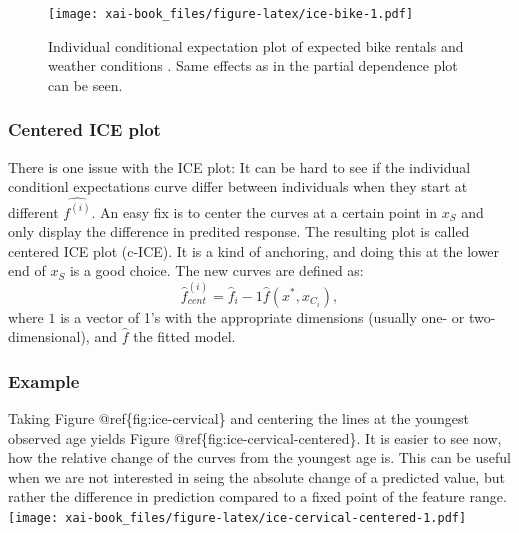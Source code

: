 \documentclass[12pt,]{krantz}
\theoremstyle{definition}
\theoremstyle{definition}
\theoremstyle{definition}
\theoremstyle{remark}
\begin{document}
\begin{figure}
\centering
\texttt{[image: xai-book\_files/figure-latex/ice-bike-1.pdf]}
\caption{\label{fig:ice-bike}Individual conditional expectation plot of
expected bike rentals and weather conditions . Same effects as in the
partial dependence plot can be seen.}
\end{figure}

\subsubsection{Centered ICE plot}\label{centered-ice-plot}

There is one issue with the ICE plot: It can be hard to see if the
individual conditionl expectations curve differ between individuals when
they start at different \(\hat{f^{(i)}}\). An easy fix is to center the
curves at a certain point in \(x_S\) and only display the difference in
predited response. The resulting plot is called centered ICE plot
(c-ICE). It is a kind of anchoring, and doing this at the lower end of
\(x_S\) is a good choice. The new curves are defined as:
\[\hat{f}_{cent}^{(i)} = \hat{f}_i - 1\hat{f}(x^{\text{*}}, x_{C_i}), \]
where \(1\) is a vector of 1's with the appropriate dimensions (usually
one- or two-dimensional), and \(\hat{f}\) the fitted model.

\subsubsection{Example}\label{example-1}

Taking Figure @ref\{fig:ice-cervical\} and centering the lines at the
youngest observed age yields Figure @ref\{fig:ice-cervical-centered\}.
It is easier to see now, how the relative change of the curves from the
youngest age is. This can be useful when we are not interested in seing
the absolute change of a predicted value, but rather the difference in
prediction compared to a fixed point of the feature range.
\texttt{[image: xai-book\_files/figure-latex/ice-cervical-centered-1.pdf]}
\end{document}
